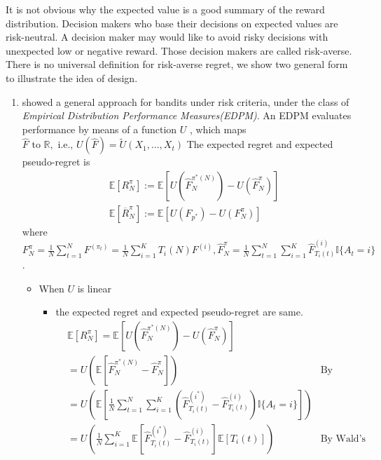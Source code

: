 \documentclass{article}
\begin{document}
It is not obvious why the expected value is a good summary of the reward distribution. Decision makers who base their decisions on expected values are risk-neutral. A decision maker may would like to avoid risky decisions with unexpected low or negative reward. Those decision makers are called risk-averse. There is no universal definition for risk-averse regret, we show two general form to illustrate the idea of design. 
    \begin{enumerate}
         \item \textcite{cassel2018general} showed a general approach for bandits under risk criteria, under the class of \textit{Empirical Distribution Performance Measures(EDPM)}. An EDPM evaluates performance by means of a function $U$ , which maps $\hat{F} \text { to } \mathbb{R}, \text { i.e., } U(\hat{F})=\tilde{U}\left(X_{1}, \ldots, X_{t}\right)$ The expected regret and expected pseudo-regret is 
        \begin{align}
            & \mathbb{E}[R_N^{\pi}] :=\mathbb{E}\left[U\left(\hat{F}_{N}^{\pi^{*}(N)}\right)-U\left(\hat{F}_{N}^{\pi}\right)\right]\\
            & \mathbb{E}[\overline{R}_N^{\pi}] :=\mathbb{E}\left[U\left(F_{p^{*}}\right)-U\left(F_{N}^{\pi}\right)\right]
        \end{align}
        where $F_{N}^{\pi}=\frac{1}{N} \sum_{t=1}^{N} F^{\left(\pi_{t}\right)}=\frac{1}{N} \sum_{i=1}^{K} T_{i}(N) F^{(i)}, \hat{F}_{N}^{\pi}= \frac{1}{N} \sum_{t=1}^{N} \sum_{i = 1}^{K} \hat{F}_{T_i(t)}^{(i)} \mathbb{I}\{A_t = i\}$.
        \begin{itemize}
            \item When $U$ is linear
            \begin{itemize}
                \item the expected regret and expected pseudo-regret are same. 
                \begin{align}
                &\mathbb{E}[R_N^{\pi}] =\mathbb{E}\left[U\left(\hat{F}_{N}^{\pi^{*}(N)}\right)-U\left(\hat{F}_{N}^{\pi}\right)\right]\\
                 &=U\left(\mathbb{E}\left[\hat{F}_{N}^{\pi^{*}(N)}-\hat{F}_{N}^{\pi}\right]\right) & \text{By Jensen's inequality, when U is affine (linear)} \\
                 &= U\left(\mathbb{E}\left[\frac{1}{N} \sum_{t=1}^{N} \sum_{i = 1}^{K} \left(\hat{F}_{T_i(t)}^{(i^\ast)} - \hat{F}_{T_i(t)}^{(i)} \right) \mathbb{I}\{A_t = i\}\right]\right)\\
                 &= U\left(\frac{1}{N} \sum_{i = 1}^{K} \mathbb{E}\left[\hat{F}_{T_i(t)}^{(i^\ast)} - \hat{F}_{T_i(t)}^{(i)} \right] \mathbb{E}\left[T_i(t)\right]\right) & \text{By Wald's Theorem}\\

\end{align}
\end{itemize}
\end{itemize}
\end{enumerate}
\end{document}
